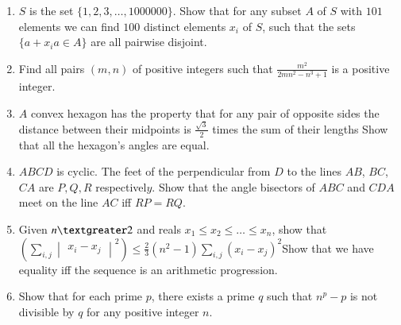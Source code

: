 \documentclass[12pt,-letter paper]{article}
\providecommand{\mydet}[1]{\ensuremath{\begin{vmatrix}#1\end{vmatrix}}}
\providecommand{\brak}[1]{\ensuremath{\left(#1\right)}}
\begin{document}
\begin{enumerate}
	\item $S$ is the set $\{1,2,3,\ldots,1000000\}$. Show that for any subset $A$ of $S$ with $101$ elements we can find $100$ distinct elements $x_{i}$ of $S$, such that the sets $\{a+x_{i} a\in A\}$ are all pairwise disjoint.
	\item Find all pairs $\brak{m,n}$ of positive integers such that $\frac{m^{2}}{2mn^{2}-n^{3}+1}$ is a positive integer.
\item $A$ convex hexagon has the property that for any pair of opposite sides the distance between their midpoints is $\frac{\sqrt{3}}{2}$ times the sum of their lengths Show that all the hexagon's angles are equal.
\item $ABCD$ is cyclic. The feet of the perpendicular from $D$ to the lines $AB$, $BC$, $CA$ are $P, Q,R$ respectivel$y$. Show that the angle bisectors of $ABC$ and $CDA$ meet on the line $AC$ iff $RP = RQ$.
\item Given $n \textgreater 2$ and reals $x_{1} \leq x_{2} \leq \ldots\leq x_{n}$, show that $\brak{\sum_{i,j} \mydet{x_i - x_j}^2} \leq \frac{2}{3}\brak{n^2-1}\sum_{i,j} \brak{x_i - x_j}^2$Show that we have equality iff the sequence is an arithmetic progression.
\item Show that for each prime $p$, there exists a prime $q$ such that $n^{p}-p$ is not divisible by $q$ for any positive integer $n$.
\end{enumerate}
\end{document}
